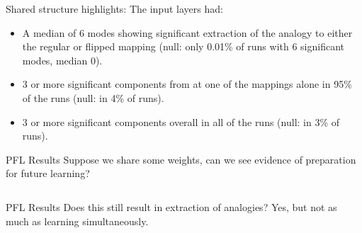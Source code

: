 \documentclass{beamer}
\begin{document}
\begin{frame}{Shared structure highlights:}
The input layers had:
\begin{itemize}
    \item<1-> A median of 6 modes showing significant extraction of the analogy to either the regular or flipped mapping (null: only 0.01\% of runs with 6 significant modes, median 0).
    \item<2-> 3 or more significant components from at one of the mappings alone in 95\% of the runs (null: in 4\% of runs).
    \item<3-> 3 or more significant components overall in all of the runs (null: in 3\% of runs).
\end{itemize}
\end{frame}

\begin{frame}{PFL Results}
Suppose we share some weights, can we see evidence of preparation for future learning?\\[11pt]
\begin{columns}
\end{columns}
\end{frame}

\begin{frame}{PFL Results}
Does this still result in extraction of analogies? Yes, but not as much as learning simultaneously.\\[11pt]
\begin{columns}
\end{columns}
\end{frame}
\end{document}
